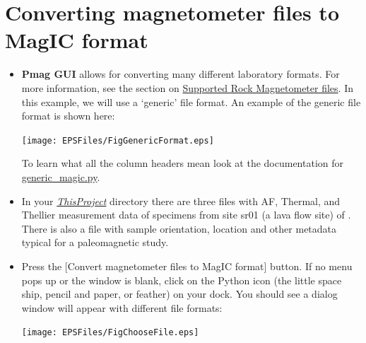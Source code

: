 \documentclass[11pt]{book}
\begin{document}
{{ 

\section{Converting magnetometer files to MagIC format}
\begin{itemize}
\item {\bf Pmag GUI} allows for converting many different laboratory formats.  For more information, see the section on \href{#magnetometer_files}{Supported Rock Magnetometer files}.   In this example, we will use a `generic' file format.
An example of the generic file format is shown here:

\texttt{[image: EPSFiles/FigGenericFormat.eps]}

To learn what all the column headers mean look at the documentation for \href{#generic_magic.py}{generic\_magic.py}.

%


\item In your  \href{#Project_Directory}{\it ThisProject} directory  there are three files with AF, Thermal, and Thellier measurement data of specimens from site sr01 (a lava flow site) of \cite{tauxe04b}.  There is also a file with sample orientation, location and other metadata typical for a paleomagnetic study.
\item Press the [Convert magnetometer files to MagIC format] button. If no menu pops up or the window is blank, click on the Python icon  (the little space ship, pencil and paper, or feather) on your dock. You should see a dialog window will appear with different file formats:

\texttt{[image: EPSFiles/FigChooseFile.eps]}


\end{itemize}}}
\end{document}
